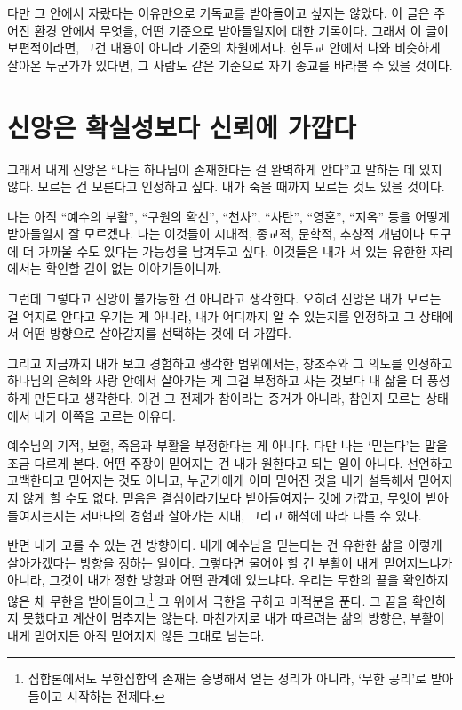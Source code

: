 \documentclass[11pt]{article}
\begin{document}
다만 그 안에서 자랐다는 이유만으로 기독교를 받아들이고 싶지는 않았다. 이 글은
주어진 환경 안에서 무엇을, 어떤 기준으로 받아들일지에 대한 기록이다. 그래서 이
글이 보편적이라면, 그건 내용이 아니라 기준의 차원에서다. 힌두교 안에서 나와
비슷하게 살아온 누군가가 있다면, 그 사람도 같은 기준으로 자기 종교를 바라볼 수
있을 것이다.

\section{신앙은 확실성보다 신뢰에 가깝다}

그래서 내게 신앙은 “나는 하나님이 존재한다는 걸 완벽하게 안다”고 말하는 데 있지
않다. 모르는 건 모른다고 인정하고 싶다. 내가 죽을 때까지 모르는 것도 있을
것이다.

나는 아직 “예수의 부활”, “구원의 확신”, “천사”, “사탄”, “영혼”, “지옥” 등을
어떻게 받아들일지 잘 모르겠다. 나는 이것들이 시대적, 종교적, 문학적, 추상적
개념이나 도구에 더 가까울 수도 있다는 가능성을 남겨두고 싶다. 이것들은 내가
서 있는 유한한 자리에서는 확인할 길이 없는 이야기들이니까.

그런데 그렇다고 신앙이 불가능한 건 아니라고 생각한다. 오히려 신앙은 내가 모르는
걸 억지로 안다고 우기는 게 아니라, 내가 어디까지 알 수 있는지를 인정하고 그
상태에서 어떤 방향으로 살아갈지를 선택하는 것에 더 가깝다.

그리고 지금까지 내가 보고 경험하고 생각한 범위에서는, 창조주와 그 의도를
인정하고 하나님의 은혜와 사랑 안에서 살아가는 게 그걸 부정하고 사는 것보다 내
삶을 더 풍성하게 만든다고 생각한다. 이건 그 전제가 참이라는 증거가 아니라,
참인지 모르는 상태에서 내가 이쪽을 고르는 이유다.

예수님의 기적, 보혈, 죽음과 부활을 부정한다는 게 아니다. 다만 나는 ‘믿는다’는
말을 조금 다르게 본다. 어떤 주장이 믿어지는 건 내가 원한다고 되는 일이 아니다.
선언하고 고백한다고 믿어지는 것도 아니고, 누군가에게 이미 믿어진 것을 내가
설득해서 믿어지지 않게 할 수도 없다. 믿음은 결심이라기보다 받아들여지는 것에
가깝고, 무엇이 받아들여지는지는 저마다의 경험과 살아가는 시대, 그리고 해석에
따라 다를 수 있다.

반면 내가 고를 수 있는 건 방향이다. 내게 예수님을 믿는다는 건 유한한 삶을
이렇게 살아가겠다는 방향을 정하는 일이다. 그렇다면 물어야 할 건 부활이 내게
믿어지느냐가 아니라, 그것이 내가 정한 방향과 어떤 관계에 있느냐다. 우리는
무한의 끝을 확인하지 않은 채 무한을 받아들이고,\footnote{집합론에서도
무한집합의 존재는 증명해서 얻는 정리가 아니라, ‘무한 공리’로 받아들이고
시작하는 전제다.} 그 위에서 극한을 구하고 미적분을 푼다. 그 끝을 확인하지
못했다고 계산이 멈추지는 않는다. 마찬가지로 내가 따르려는 삶의 방향은, 부활이
내게 믿어지든 아직 믿어지지 않든 그대로 남는다.
\end{document}
